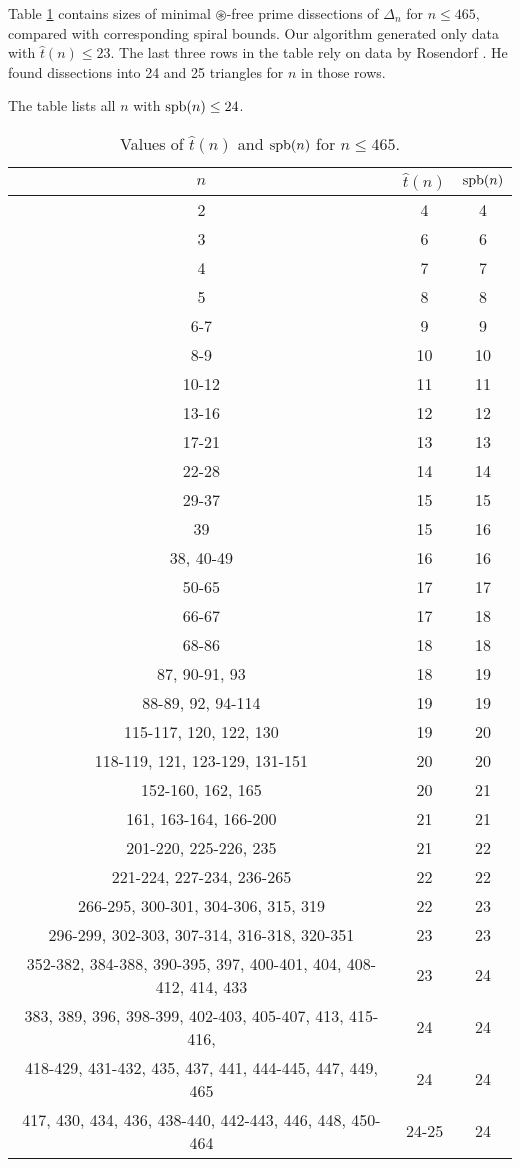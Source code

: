 \setcounter{chapter}{1}
\label{app:values-tn}

Table \ref{tab:tp} contains sizes of minimal $\circledast$-free prime dissections of $\Delta_n$ for $n \leq 465$, compared with corresponding spiral bounds. Our algorithm generated only data with $\hat t(n) \leq 23$. The last three rows in the table rely on data by Rosendorf \cite{Rosendorf04}. He found dissections into 24 and 25 triangles for $n$ in those rows.

The table lists all $n$ with $\mathop{\mathrm{spb}}(n) \leq 24$.

\begin{table}[ht]
	\centering
	\begin{tabular} {c | c c}
		$n$ & $\hat{t}(n)$ & $\mathop{\mathrm{spb}}(n)$ \\ \hline
		2 & 4 & 4 \\
		3 & 6 & 6 \\
		4 & 7 & 7 \\
		5 & 8 & 8 \\
		6-7 & 9 & 9 \\
		8-9 & 10 & 10 \\
		10-12 & 11 & 11 \\
		13-16 & 12 & 12 \\
		17-21 & 13 & 13 \\
		22-28 & 14 & 14 \\
		29-37 & 15 & 15 \\
		39 & 15 & 16 \\
		38, 40-49 & 16 & 16 \\
		50-65 & 17 & 17 \\
		66-67 & 17 & 18 \\
		68-86 & 18 & 18 \\
		87, 90-91, 93 & 18 & 19 \\
		88-89, 92, 94-114 & 19 & 19 \\
		115-117, 120, 122, 130 & 19 & 20 \\
		118-119, 121, 123-129, 131-151 & 20 & 20 \\
		152-160, 162, 165 & 20 & 21 \\
		161, 163-164, 166-200 & 21 & 21 \\
		201-220, 225-226, 235 & 21 & 22 \\
		221-224, 227-234, 236-265 & 22 & 22 \\
		266-295, 300-301, 304-306, 315, 319 & 22 & 23 \\
		296-299, 302-303, 307-314, 316-318, 320-351 & 23 & 23 \\
		352-382, 384-388, 390-395, 397, 400-401, 404, 408-412, 414, 433 & 23 & 24 \\
		383, 389, 396, 398-399, 402-403, 405-407, 413, 415-416, & 24 & 24 \\
		418-429, 431-432, 435, 437, 441, 444-445, 447, 449, 465 & 24 & 24 \\
		417, 430, 434, 436, 438-440, 442-443, 446, 448, 450-464 & 24-25 & 24
	\end{tabular}
	\caption{Values of $\hat{t}(n)$ and $\mathop{\mathrm{spb}}(n)$ for $n \leq 465$.}
	\label{tab:tp}
\end{table}


